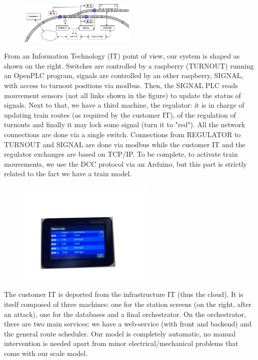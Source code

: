 \documentclass[runningheads]{llncs}
\begin{document}
\medskip

\begin{figure}
\vspace{-6mm}
\includegraphics[height=20mm]{TrainSchema.png}
\end{figure}


From an Information Technology (IT) point of view, our system is shaped as shown on the right. Switches are controlled by a raspberry (TURNOUT) running an OpenPLC program, signals are controlled by an other raspberry, SIGNAL, with access to turnout positions via modbus. Then, the SIGNAL PLC reads mouvement sensors  (not all links shown in the figure) to update the status of signals. Next to that, we have a third machine, the regulator: it is in charge of updating train routes (as required by the customer IT),  of the regulation of turnouts and finally it may lock some signal (turn it to "red"). All the network connections are done via a single switch. Connections from REGULATOR to TURNOUT and SIGNAL are done via modbus while the customer IT and the regulator exchanges  are based on TCP/IP.  To be complete, to activate train mouvements, we use the DCC protocol via an Arduino, but this part is strictly related to the fact we have a train model. 


\begin{figure}
\hspace{-10mm}
 \begin{minipage}{0.3\textwidth}
        \centering
        \vspace{-24mm}
\includegraphics[height=50mm]{ZoomAffichage.png}
    \end{minipage}
\end{figure}

 The customer IT is deported from the infrastructure IT (thus the cloud).  It is itself composed of three machines: one for the station screens (on the right, after an attack), one for the databases and a final orchestrator. On the orchestrator, there are two main services: we have a web-service (with front and backend) and the general route scheduler.  Our model is completely automatic, no manual intervention is needed apart from minor electrical/mechanical problems that come with our scale model.
 
\end{document}
